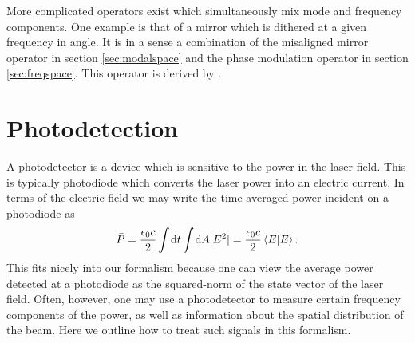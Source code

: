 More complicated operators exist which simultaneously mix mode and frequency components. %
One example is that of a mirror which is dithered at a given frequency in angle. %
It is in a sense a combination of the misaligned mirror operator in section \ref{sec:modalspace} and the phase modulation operator in section \ref{sec:freqspace}. %
This operator is derived by \citet{Sigg:00}.
\section{Photodetection}
A photodetector is a device which is sensitive to the power in the laser field. %
This is typically photodiode which converts the laser power into an electric current. %
In terms of the electric field we may write the time averaged power incident on a photodiode as
\begin{equation}
\bar{P}=\frac{\epsilon_0 c}{2}\int \! \! \dd t \int \! \! \dd A|E^2|=\frac{\epsilon_0 c}{2}\inprod{E}{E}.
\end{equation}
This fits nicely into our formalism because one can view the average power detected at a photodiode as the squared-norm of the state vector of the laser field. %
Often, however, one may use a photodetector to measure certain frequency components of the power, as well as information about the spatial distribution of the beam. %
Here we outline how to treat such signals in this formalism.

